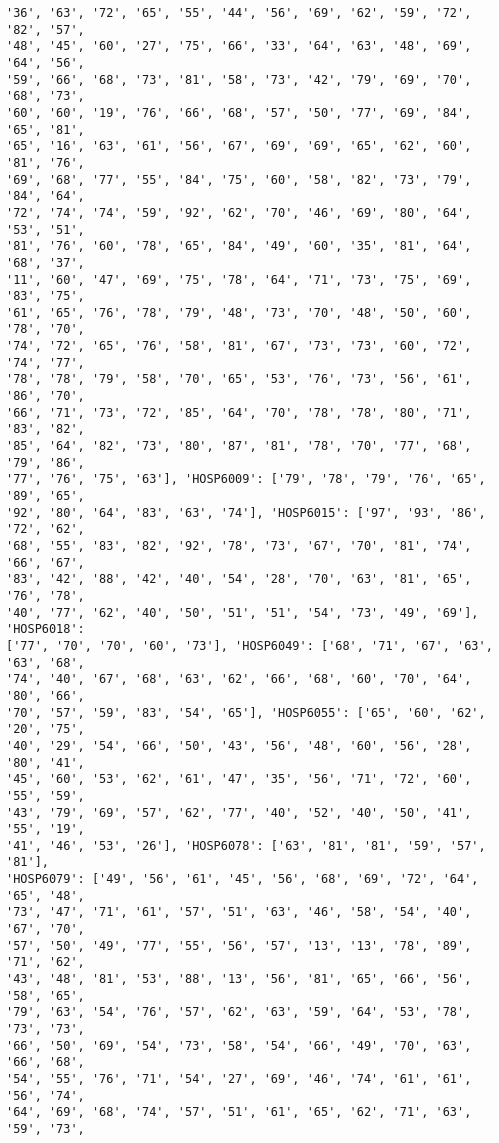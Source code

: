 \documentclass[11pt]{article}
\begin{document}
\begin{Verbatim}[commandchars=\\\{\}]
'36', '63', '72', '65', '55', '44', '56', '69', '62', '59', '72', '82', '57',
'48', '45', '60', '27', '75', '66', '33', '64', '63', '48', '69', '64', '56',
'59', '66', '68', '73', '81', '58', '73', '42', '79', '69', '70', '68', '73',
'60', '60', '19', '76', '66', '68', '57', '50', '77', '69', '84', '65', '81',
'65', '16', '63', '61', '56', '67', '69', '69', '65', '62', '60', '81', '76',
'69', '68', '77', '55', '84', '75', '60', '58', '82', '73', '79', '84', '64',
'72', '74', '74', '59', '92', '62', '70', '46', '69', '80', '64', '53', '51',
'81', '76', '60', '78', '65', '84', '49', '60', '35', '81', '64', '68', '37',
'11', '60', '47', '69', '75', '78', '64', '71', '73', '75', '69', '83', '75',
'61', '65', '76', '78', '79', '48', '73', '70', '48', '50', '60', '78', '70',
'74', '72', '65', '76', '58', '81', '67', '73', '73', '60', '72', '74', '77',
'78', '78', '79', '58', '70', '65', '53', '76', '73', '56', '61', '86', '70',
'66', '71', '73', '72', '85', '64', '70', '78', '78', '80', '71', '83', '82',
'85', '64', '82', '73', '80', '87', '81', '78', '70', '77', '68', '79', '86',
'77', '76', '75', '63'], 'HOSP6009': ['79', '78', '79', '76', '65', '89', '65',
'92', '80', '64', '83', '63', '74'], 'HOSP6015': ['97', '93', '86', '72', '62',
'68', '55', '83', '82', '92', '78', '73', '67', '70', '81', '74', '66', '67',
'83', '42', '88', '42', '40', '54', '28', '70', '63', '81', '65', '76', '78',
'40', '77', '62', '40', '50', '51', '51', '54', '73', '49', '69'], 'HOSP6018':
['77', '70', '70', '60', '73'], 'HOSP6049': ['68', '71', '67', '63', '63', '68',
'74', '40', '67', '68', '63', '62', '66', '68', '60', '70', '64', '80', '66',
'70', '57', '59', '83', '54', '65'], 'HOSP6055': ['65', '60', '62', '20', '75',
'40', '29', '54', '66', '50', '43', '56', '48', '60', '56', '28', '80', '41',
'45', '60', '53', '62', '61', '47', '35', '56', '71', '72', '60', '55', '59',
'43', '79', '69', '57', '62', '77', '40', '52', '40', '50', '41', '55', '19',
'41', '46', '53', '26'], 'HOSP6078': ['63', '81', '81', '59', '57', '81'],
'HOSP6079': ['49', '56', '61', '45', '56', '68', '69', '72', '64', '65', '48',
'73', '47', '71', '61', '57', '51', '63', '46', '58', '54', '40', '67', '70',
'57', '50', '49', '77', '55', '56', '57', '13', '13', '78', '89', '71', '62',
'43', '48', '81', '53', '88', '13', '56', '81', '65', '66', '56', '58', '65',
'79', '63', '54', '76', '57', '62', '63', '59', '64', '53', '78', '73', '73',
'66', '50', '69', '54', '73', '58', '54', '66', '49', '70', '63', '66', '68',
'54', '55', '76', '71', '54', '27', '69', '46', '74', '61', '61', '56', '74',
'64', '69', '68', '74', '57', '51', '61', '65', '62', '71', '63', '59', '73',

\end{Verbatim}
\end{document}
